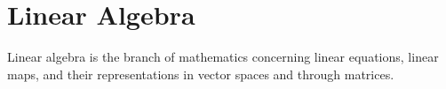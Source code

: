 \chapter{Linear Algebra}
\thispagestyle{fancy}

Linear algebra is the branch of mathematics concerning linear equations, linear maps, and their representations in vector spaces and through matrices.
